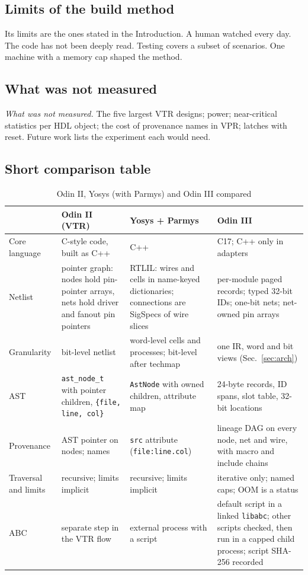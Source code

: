 \documentclass[conference]{IEEEtran}
\newcommand{\code}[1]{\texttt{#1}}
\begin{document}
\subsection{Limits of the build method}

Its limits are the ones stated in the Introduction. A human watched every day. The code has not been deeply read. Testing covers a subset of scenarios. One machine with a memory cap shaped the method.

\subsection{What was not measured}

\emph{What was not measured.} The five largest VTR designs; power; near-critical statistics per HDL object; the cost of provenance names in VPR; latches with reset. Future work lists the experiment each would need.

\subsection{Short comparison table}

\begin{table}[t]
\caption{Odin II, Yosys (with Parmys) and Odin III compared}
\label{tab:compare-short}
\centering
\footnotesize
\begin{tabular}{@{}p{}p{}p{}p{}@{}}
\toprule
 & Odin II (VTR) & Yosys + Parmys & Odin III \\
\midrule
Core language & C-style code, built as C++ & C++ & C17; C++ only in adapters \\
Netlist & pointer graph: nodes hold pin-pointer arrays, nets hold driver and fanout pin pointers &
  RTLIL: wires and cells in name-keyed dictionaries; connections are SigSpecs of wire slices &
  per-module paged records; typed 32-bit IDs; one-bit nets; net-owned pin arrays \\
Granularity & bit-level netlist & word-level cells and processes; bit-level after techmap &
  one IR, word and bit views (Sec.~\ref{sec:arch}) \\
AST & \code{ast\_node\_t} with pointer children, \code{\{file, line, col\}} & \code{AstNode}
  with owned children, attribute map & 24-byte records, ID spans, slot table, 32-bit locations \\
Provenance & AST pointer on nodes; names & \code{src} attribute (\code{file:line.col}) &
  lineage DAG on every node, net and wire, with macro and include chains \\
Traversal and limits & recursive; limits implicit & recursive; limits implicit & iterative only; named caps; OOM is a status \\
ABC & separate step in the VTR flow & external process with a script & default script in a
  linked \code{libabc}; other scripts checked, then run in a capped child process; script
  SHA-256 recorded \\
\bottomrule
\end{tabular}
\end{table}
\end{document}
